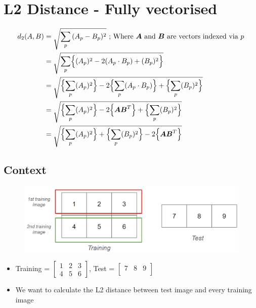 \documentclass{article}
\begin{document}
\section{L2 Distance - Fully vectorised}
\begin{equation*}
    \begin{split}
    d_{2}(A,B) & = \sqrt{\sum_{p}{(A_{p}-B_{p})^{2}}} \text{ ; Where $\boldsymbol{A}$ and $\boldsymbol{B}$ are vectors indexed via $p$} \\
               & = \sqrt{\sum_{p}\Bigl\{(A_{p})^{2} - 2(A_{p} \cdot B_{p}) + (B_{p})^{2}\Bigr\}} \\
               & = \sqrt{\Bigl\{\sum_{p}(A_{p})^{2}\Bigr\} -2\Bigl\{\sum_{p}(A_{p} \cdot B_{p}) \Bigr\} + \Bigl\{\sum_{p}(B_{p})^{2}\Bigr\}} \\
               & = \sqrt{\Bigl\{\sum_{p}(A_{p})^{2}\Bigr\} -2\Bigl\{ \boldsymbol{A}\boldsymbol{B}^{T} \Bigr\} + \Bigl\{\sum_{p}(B_{p})^{2}\Bigr\}} \\
               & = \sqrt{\Bigl\{\sum_{p}(A_{p})^{2}\Bigr\} + \Bigl\{\sum_{p}(B_{p})^{2}\Bigr\} -2\Bigl\{ \boldsymbol{A}\boldsymbol{B}^{T} \Bigr\} }
    \end{split}
\end{equation*}

\subsection{Context}
\begin{figure}[htp]
    \centering
    \includegraphics[width=12cm, scale=1]{images/knn_broadcast.PNG}
    \caption{}
\end{figure}
\begin{itemize}
    \item Training =  
            $\begin{bmatrix}
                1 & 2 & 3 \\
                4 & 5 & 6
            \end{bmatrix}$, 
          Test = 
            $\begin{bmatrix}
                7 & 8 & 9 \\
            \end{bmatrix}$
    \item We want to calculate the L2 distance between test image and every training image
\end{itemize}
\end{document}
